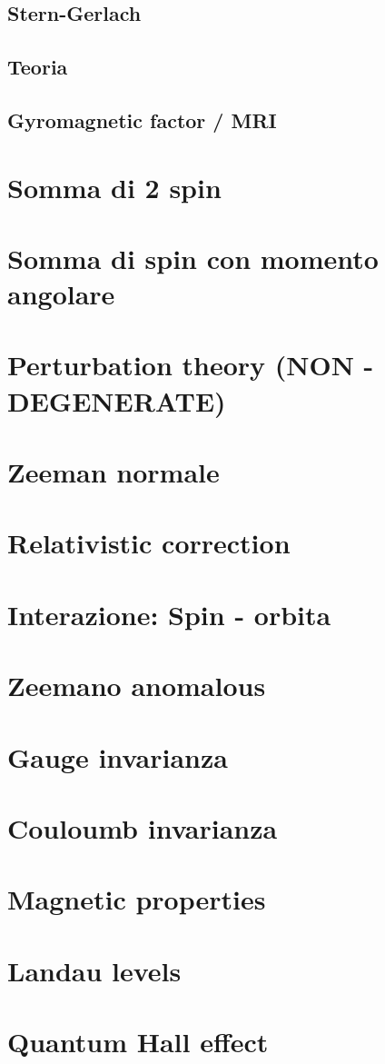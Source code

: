 \subsection{Stern-Gerlach}
\subsection{Teoria}
\subsection{Gyromagnetic factor / MRI}

\section{Somma di 2 spin}
\section{Somma di spin con momento angolare}
\section{Perturbation theory (NON - DEGENERATE)}
\section{Zeeman normale}
\section{Relativistic correction}
\section{Interazione: Spin - orbita}
\section{Zeemano anomalous}
\section{Gauge invarianza}
\section{Couloumb invarianza}
\section{Magnetic properties}
\section{Landau levels}
\section{Quantum Hall effect}